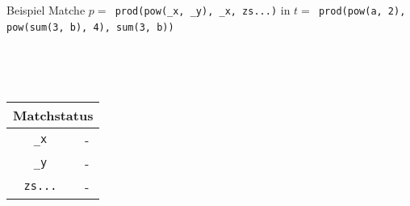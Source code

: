

\begin{frame}[fragile]{Beispiel}
	Matche $p =$\verb~ prod(pow(_x, _y), _x, zs...)~ in 
	$t =$\verb~ prod(pow(a, 2), pow(sum(3, b), 4), sum(3, b))~
	~\\
	\begin{columns}[c] %
		\scriptsize
        \begin{column}{0.3\textwidth}	
			~\\~\\
			\begin{tabular} {c|c}
			\multicolumn{2}{c}{Matchstatus}\\
			\hline
			\verb~_x~      & -            \\
			\verb~_y~      & -            \\
			\verb~zs...~   & -            
			\end{tabular}
        \end{column}
		
        \begin{column}{0.3\textwidth}	
        \end{column}
	\end{columns}
\end{frame}

